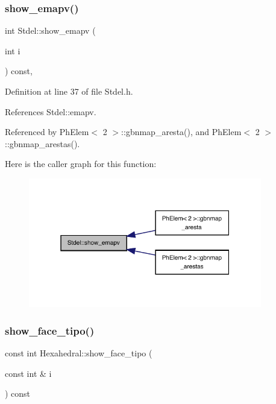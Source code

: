\subsubsection{\texorpdfstring{show\+\_\+emapv()}{show\_emapv()}}
{\footnotesize\ttfamily int Stdel\+::show\+\_\+emapv (\begin{DoxyParamCaption}\item[{int}]{i }\end{DoxyParamCaption}) const\hspace{0.3cm}{\ttfamily [inline]}, {\ttfamily [inherited]}}



Definition at line 37 of file Stdel.\+h.



References Stdel\+::emapv.



Referenced by Ph\+Elem$<$ 2 $>$\+::gbnmap\+\_\+aresta(), and Ph\+Elem$<$ 2 $>$\+::gbnmap\+\_\+arestas().

Here is the caller graph for this function\+:
\nopagebreak
\begin{figure}[H]
\begin{center}
\leavevmode
\includegraphics[width=289pt]{classStdel_ad474ffc52b051ae8317b3fdb583c4c98_icgraph}
\end{center}
\end{figure}
\mbox{\label{classHexahedral_a178069c54d64ffb98dba409cd5080ede}} 
\subsubsection{\texorpdfstring{show\+\_\+face\+\_\+tipo()}{show\_face\_tipo()}}
{\footnotesize\ttfamily const int Hexahedral\+::show\+\_\+face\+\_\+tipo (\begin{DoxyParamCaption}\item[{const int \&}]{i }\end{DoxyParamCaption}) const\hspace{0.3cm}{\ttfamily [virtual]}}



